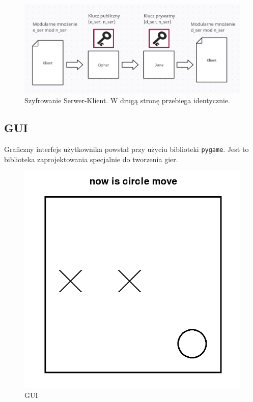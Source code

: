 \documentclass[a4paper,12pt]{article}
\begin{document}
\begin{figure}[ht]
	\centerline{\includegraphics[scale=0.6]{ProceszSzyfrowania.png}}
	\caption{Szyfrowanie Serwer-Klient. W drugą stronę przebiega identycznie.}
\end{figure}

\subsection{GUI}

Graficzny interfejs użytkownika powstał przy użyciu biblioteki \texttt{pygame}. Jest to
biblioteka zaprojektowania specjalnie do tworzenia gier.

\begin{figure}[ht]
\centerline{\includegraphics[scale=0.4]{gui.png}}
\caption{GUI}
\end{figure}
\end{document}
